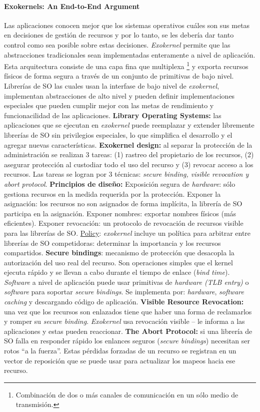 \paragraph{\textnormal{\textbf{Exokernels: An End-to-End Argument}}}
Las aplicaciones conocen mejor que los sistemas operativos cuáles son sus metas en decisiones de gestión de recursos y por lo tanto, se les debería dar tanto control como sea posible sobre estas decisiones. \textit{Exokernel} permite que las abstracciones tradicionales sean implementadas enteramente a nivel de aplicación. Esta arquitectura consiste de una capa fina que multiplexa  \footnote{Combinación de dos o más canales de comunicación en un sólo medio de transmisión.} y exporta recursos físicos de forma segura a través de un conjunto de primitivas de bajo nivel. Librerías de SO las cuales usan la interfase de bajo nivel de \textit{exokernel}, implementan abstracciones de alto nivel y pueden definir implementaciones especiales que pueden cumplir mejor con las metas de rendimiento y funcionacilidad de las aplicaciones. \textbf{Library Operating Systems:} las aplicaciones que se ejecutan en \textit{exokernel} puede reemplazar y extender libremente librerías de SO sin privilegios especiales, lo que simplifica el desarrollo y el agregar nuevas características. \textbf{Exokernel design:} al separar la protección de la administración se realizan 3 tareas: (1) rastreo del propietario de los recursos, (2) asegurar protección al custodiar todo el uso del recurso y (3) revocar acceso a los recursos. Las tareas se logran por 3 técnicas: \textit{secure binding, visible revocation \textnormal{y} abort protocol}. \textbf{Principios de diseño:} Exposición segura de \textit{hardware}: sólo gestiona recursos en la medida requerida por la protección. Exponer la asignación: los recursos no son asignados de forma implícita, la librería de SO participa en la asignación. Exponer nombres: exportar nombres físicos (más eficientes). Exponer revocación: un protocolo de revocación de recursos visible para las librerías de SO. \underline{Policy}: \textit{exokernel} incluye un política para arbitrar entre librerías de SO competidoras: determinar la importancia y los recursos compartidos. \textbf{Secure bindings}: mecanismo de protección que desacopla la autorización del uso real del recurso. Son operaciones simples que el kernel ejecuta rápido y se llevan a cabo durante el tiempo de enlace (\textit{bind time}). \textit{Software} a nivel de aplicación puede usar primitivas de \textit{hardware (TLB entry)} o \textit{software} para soportar \textit{secure bindings}. Se implementa por: \textit{hardware}, \textit{software caching} y descargando código de aplicación. \textbf{Visible Resource Revocation:} una vez que los recursos son enlazados tiene que haber una forma de reclamarlos y romper su \textit{secure binding}. \textit{Exokernel} usa revocación visible -- le informa a las aplicaciones y estas pueden reaccionar. \textbf{The Abort Protocol:} si una librería de SO falla en responder rápido los enlances seguros (\textit{secure bindings}) necesitan ser rotos ``a la fuerza''. Estas pérdidas forzadas de un recurso se registran en un vector de reposición que se puede usar para actualizar los mapeos hacia ese recurso.
 

